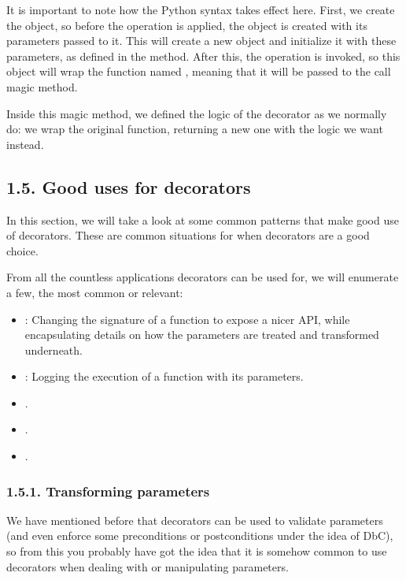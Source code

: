 \documentclass[a4paper,10pt,english]{sphinxmanual}
\begin{document}
It is important to note how the Python syntax takes effect here. First, we create the object, so
before the  operation is applied, the object is created with its parameters passed to it. This
will create a new object and initialize it with these parameters, as defined in the 
method. After this, the  operation is invoked, so this object will wrap the function named
, meaning that it will be passed to the call magic
method.

Inside this  magic method, we defined the logic of the decorator as we normally
do: we wrap the original function, returning a new one with the logic we want instead.


\subsection{1.5. Good uses for decorators}
\label{\detokenize{chapters/5_decorators/index:good-uses-for-decorators}}
In this section, we will take a look at some common patterns that make good use of
decorators. These are common situations for when decorators are a good choice.

From all the countless applications decorators can be used for, we will enumerate a few, the
most common or relevant:
\begin{itemize}
\item {} 
: Changing the signature of a function to expose a nicer API, while encapsulating details on how the parameters are treated and transformed underneath.

\item {} 
: Logging the execution of a function with its parameters.

\item {} 
.

\item {} 
.

\item {} 
.

\end{itemize}


\subsubsection{1.5.1. Transforming parameters}
\label{\detokenize{chapters/5_decorators/index:transforming-parameters}}
We have mentioned before that decorators can be used to validate parameters (and even
enforce some preconditions or postconditions under the idea of DbC), so from this you
probably have got the idea that it is somehow common to use decorators when dealing
with or manipulating parameters.
\end{document}
